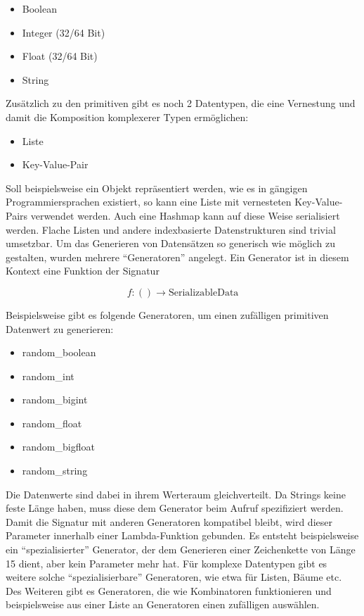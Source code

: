 \documentclass[ngerman]{seminarvorlage}
\begin{document}
\begin{itemize}
  \item Boolean
  \item Integer (32/64 Bit)
  \item Float (32/64 Bit)
  \item String
\end{itemize}

Zusätzlich zu den primitiven gibt es noch 2 Datentypen, die eine Vernestung und damit die Komposition komplexerer Typen ermöglichen:

\begin{itemize}
  \item Liste
  \item Key-Value-Pair
\end{itemize}

Soll beispielsweise ein Objekt repräsentiert werden, wie es in gängigen Programmiersprachen existiert, so kann eine Liste mit vernesteten Key-Value-Pairs verwendet werden. Auch eine Hashmap kann auf diese Weise serialisiert werden. Flache Listen und andere indexbasierte Datenstrukturen sind trivial umsetzbar. Um das Generieren von Datensätzen so generisch wie möglich zu gestalten, wurden mehrere ``Generatoren'' angelegt. Ein Generator ist in diesem Kontext eine Funktion der Signatur

$$f : () \to \text{SerializableData}$$

Beispielsweise gibt es folgende Generatoren, um einen zufälligen primitiven Datenwert zu generieren:

\begin{itemize}
  \item random\_boolean
  \item random\_int
  \item random\_bigint
  \item random\_float
  \item random\_bigfloat
  \item random\_string
\end{itemize}

Die Datenwerte sind dabei in ihrem Werteraum gleichverteilt. Da Strings keine feste Länge haben, muss diese dem Generator beim Aufruf spezifiziert werden. Damit die Signatur mit anderen Generatoren kompatibel bleibt, wird dieser Parameter innerhalb einer Lambda-Funktion gebunden. Es entsteht beispielsweise ein ``spezialisierter'' Generator, der dem Generieren einer Zeichenkette von Länge 15 dient, aber kein Parameter mehr hat. Für komplexe Datentypen gibt es weitere solche ``spezialisierbare'' Generatoren, wie etwa für Listen, Bäume etc. Des Weiteren gibt es Generatoren, die wie Kombinatoren funktionieren und beispielsweise aus einer Liste an Generatoren einen zufälligen auswählen.
\end{document}
